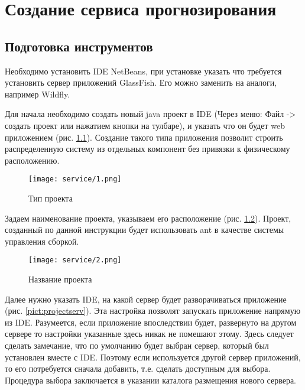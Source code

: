 \linespread{1.13}\selectfont

\chapter{Создание сервиса прогнозирования}
\section{Подготовка инструментов}
Необходимо установить IDE NetBeans, при установке указать что требуется установить сервер приложений GlassFish. Его можно заменить на аналоги, например Wildfly.  

Для начала необходимо создать новый java проект в IDE (Через меню: Файл -> создать проект или нажатием кнопки на тулбаре), и указать что он будет web приложением (рис. \ref{pict:projecttype}). Создание такого типа приложения позволит строить распределенную систему из отдельных компонент без привязки к физическому расположению. 

\begin{figure}[h!]
\center
	\texttt{[image: service/1.png]}
	\caption{Тип проекта}
	\label{pict:projecttype}
\end{figure}

Задаем наименование проекта, указываем его расположение (рис. \ref{pict:projectname}). Проект, созданный по данной инструкции будет использовать ant в качестве системы управления сборкой. 

\begin{figure}[h!]
\center
	\texttt{[image: service/2.png]}
	\caption{Название проекта}
	\label{pict:projectname}
\end{figure}

Далее нужно указать IDE, на какой сервер будет разворачиваться приложение (рис. \ref{pict:projectserv}). Эта настройка позволят запускать приложение напрямую из IDE. Разумеется, если приложение впоследствии будет, развернуто на другом сервере то настройки указанные здесь никак не помешают этому. Здесь следует сделать замечание, что по умолчанию будет выбран сервер, который был установлен вместе с IDE. Поэтому если используется другой сервер приложений, то его потребуется сначала добавить, т.е. сделать доступным для выбора. Процедура выбора заключается в указании каталога размещения нового сервера. 

